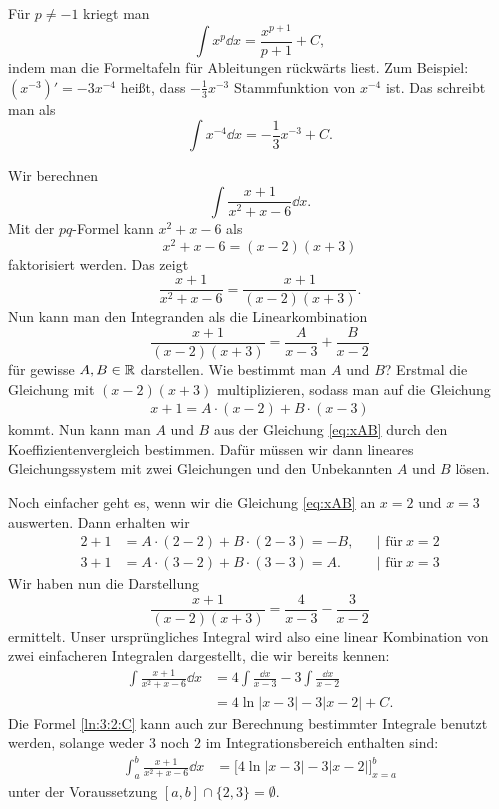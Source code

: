 \begin{bsp} 
	Für $p \ne -1$ kriegt man 
	\[
	\int x^{p} \dd x = \frac{x^{p+1}}{p+1} + C,
	\]
	indem man die Formeltafeln für Ableitungen rückwärts liest. Zum Beispiel: $(x^{-3})'= -3 x^{-4}$ heißt, dass $-\frac{1}{3} x^{-3}$ Stammfunktion von $x^{-4}$ ist. Das schreibt man als 
	\[
	\int x^{-4}  \dd x = -\frac{1}{3} x^{-3} + C.
	\] 
\end{bsp} 

\begin{bsp} 
	Wir berechnen 
	\[
	\int \frac{x+1 }{x^2 + x -6 } \dd x.
	\]
	Mit der $pq$-Formel kann $x^2+ x -6$ als 
	\[
	x^2 + x - 6 = (x-2) (x+3)
	\] faktorisiert werden. Das zeigt
	\[
	\frac{x+1 }{x^2 + x -6 } =  \frac{x+1}{(x-2)(x+3)}.
	\]
	Nun kann man den Integranden als die Linearkombination
	\[
	\frac{x+1}{(x-2) (x+3)} = \frac{ A }{x-3} + \frac{B}{x-2}
	\]
	für gewisse $A, B \in \mathbb{R}$ darstellen. Wie bestimmt man $A$ und $B$? Erstmal die Gleichung mit $(x-2) (x+3)$ multiplizieren, sodass man auf die Gleichung 
	\begin{align}
	\label{eq:xAB}
	x + 1 = A \cdot (x-2) + B \cdot (x-3)
	\end{align}
	kommt. Nun kann man $A$ und $B$ aus der Gleichung \eqref{eq:xAB} durch den Koeffizientenvergleich bestimmen. Dafür müssen wir dann lineares Gleichungssystem mit zwei Gleichungen und den Unbekannten $A$ und $B$ lösen. 
	
	Noch einfacher geht es, wenn wir die Gleichung \eqref{eq:xAB} an $x =2$ und $x=3$ auswerten. Dann erhalten wir 
	\begin{align*}
	2 + 1 & = A \cdot (2-2) + B \cdot (2-3) = -B ,  & &| \text{ für} \ x =2
	\\ 3 + 1 & = A \cdot (3-2) + B \cdot (3-3) = A. &  &| \text{ für} \ x =3
	\end{align*}
	Wir haben nun die Darstellung 
	\[
	\frac{x+1}{(x-2) (x+3)} = \frac{4}{x-3} - \frac{3}{x-2}
	\]
	ermittelt. Unser ursprüngliches Integral wird also eine linear Kombination von zwei einfacheren Integralen dargestellt, die wir bereits kennen: 
	\begin{align}
	\nonumber \int \frac{x+1 }{x^2 + x -6 } \dd x & = 4 \int \frac{\dd x}{x-3} - 3 \int \frac{\dd x}{x-2} 
	\\ & = 4 \ln |x-3| - 3 |x -2| + C. \label{ln:3:2:C} 
	\end{align}
	Die Formel \eqref{ln:3:2:C} kann auch zur Berechnung bestimmter Integrale benutzt werden, solange weder $3$ noch $2$ im Integrationsbereich enthalten sind: 
	\begin{align*}
	\int_a^b \frac{x+1 }{x^2 + x -6 } \dd x & = \biggl[ 4 \ln |x-3| - 3 |x -2| \biggr]_{x=a}^b
	\end{align*}
	unter der Voraussetzung $[a,b] \cap \{2,3\} = \emptyset$. 
\end{bsp} 

